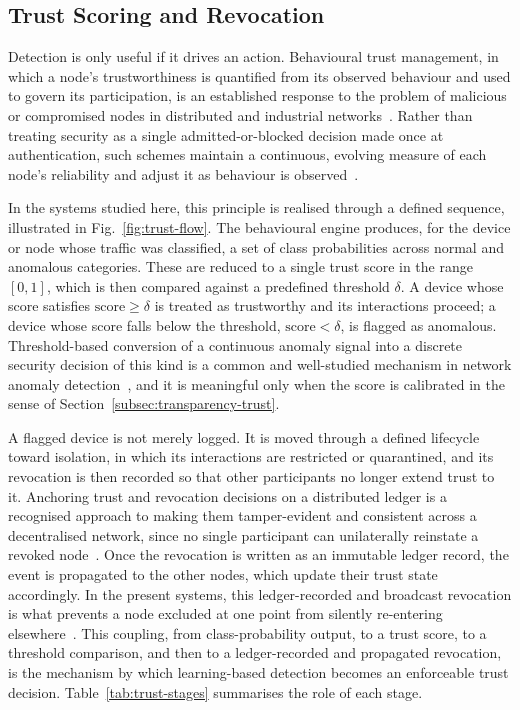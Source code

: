 \subsection{Trust Scoring and Revocation}
\label{subsec:bg-trust}

Detection is only useful if it drives an action. Behavioural trust management,
in which a node's trustworthiness is quantified from its observed behaviour and
used to govern its participation, is an established response to the problem of
malicious or compromised nodes in distributed and industrial
networks~\cite{ferraris2024survey}. Rather than treating security as a single
admitted-or-blocked decision made once at authentication, such schemes maintain
a continuous, evolving measure of each node's reliability and adjust it as
behaviour is observed~\cite{ullah2024deep}.

In the systems studied here, this principle is realised through a defined
sequence, illustrated in Fig.~\ref{fig:trust-flow}. The behavioural engine
produces, for the device or node whose traffic was classified, a set of class
probabilities across normal and anomalous categories. These are reduced to a
single trust score in the range $[0,1]$, which is then compared against a
predefined threshold $\delta$. A device whose score satisfies
$\text{score} \geq \delta$ is treated as trustworthy and its interactions proceed;
a device whose score falls below the threshold, $\text{score} < \delta$, is
flagged as anomalous. Threshold-based conversion of a continuous anomaly signal
into a discrete security decision of this kind is a common and well-studied
mechanism in network anomaly detection~\cite{komadina2024comparing}, and it is
meaningful only when the score is calibrated in the sense of
Section~\ref{subsec:transparency-trust}.

A flagged device is not merely logged. It is moved through a defined lifecycle
toward isolation, in which its interactions are restricted or quarantined, and
its revocation is then recorded so that other participants no longer extend
trust to it. Anchoring trust and revocation decisions on a distributed ledger is
a recognised approach to making them tamper-evident and consistent across a
decentralised network, since no single participant can unilaterally reinstate a
revoked node~\cite{d2025blockchain}. Once the revocation is written as an
immutable ledger record, the event is propagated to the other nodes, which
update their trust state accordingly. In the present systems, this
ledger-recorded and broadcast revocation is what prevents a node excluded at one
point from silently re-entering elsewhere~\cite{amadi2026symmetric}. This
coupling, from class-probability output, to a trust score, to a threshold
comparison, and then to a ledger-recorded and propagated revocation, is the
mechanism by which learning-based detection becomes an enforceable trust
decision. Table~\ref{tab:trust-stages} summarises the role of each stage.


